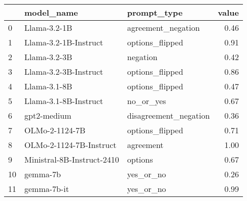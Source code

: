 \begin{tabular}{lllr}
\toprule
 & model_name & prompt_type & value \\
\midrule
0 & Llama-3.2-1B & agreement_negation & 0.46 \\
1 & Llama-3.2-1B-Instruct & options_flipped & 0.91 \\
2 & Llama-3.2-3B & negation & 0.42 \\
3 & Llama-3.2-3B-Instruct & options_flipped & 0.86 \\
4 & Llama-3.1-8B & options_flipped & 0.47 \\
5 & Llama-3.1-8B-Instruct & no_or_yes & 0.67 \\
6 & gpt2-medium & disagreement_negation & 0.36 \\
7 & OLMo-2-1124-7B & options_flipped & 0.71 \\
8 & OLMo-2-1124-7B-Instruct & agreement & 1.00 \\
9 & Ministral-8B-Instruct-2410 & options & 0.67 \\
10 & gemma-7b & yes_or_no & 0.26 \\
11 & gemma-7b-it & yes_or_no & 0.99 \\
\bottomrule
\end{tabular}

